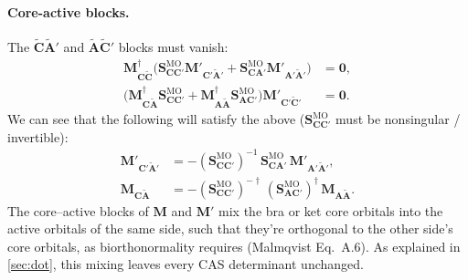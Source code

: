 \documentclass[aip,jcp,preprint]{revtex4-1}
\newcommand{\bvec}[1]{\mathbf{#1}}
\newcommand{\SMO}{\bvec{S}^{\mathrm{MO}}}
\begin{document}
\paragraph{Core-active blocks.}
The $\tilde{\bvec{C}}\tilde{\bvec{A}}'$ and $\tilde{\bvec{A}}\tilde{\bvec{C}}'$ blocks must vanish:
\begin{align}
 \bvec{M}_{\bvec{C}\tilde{\bvec{C}}}^\dagger
 \big(\SMO_{\bvec{C}\bvec{C}'}\bvec{M}'_{\bvec{C}'\tilde{\bvec{A}}'}
 + \SMO_{\bvec{C}\bvec{A}'}\bvec{M}'_{\bvec{A}'\tilde{\bvec{A}}'}\big)
 &= \bvec{0},\\
 \big(\bvec{M}_{\bvec{C}\tilde{\bvec{A}}}^\dagger\SMO_{\bvec{C}\bvec{C}'}
 + \bvec{M}_{\bvec{A}\tilde{\bvec{A}}}^\dagger\SMO_{\bvec{A}\bvec{C}'}\big)
 \bvec{M}'_{\bvec{C}'\tilde{\bvec{C}}'} &= \bvec{0}.
\end{align}
We can see that the following will satisfy the above ($\SMO_{\bvec{C}\bvec{C}'}$ must be nonsingular / invertible):
\begin{align}
 \bvec{M}'_{\bvec{C}'\tilde{\bvec{A}}'} &= -(\SMO_{\bvec{C}\bvec{C}'})^{-1}\,
 \SMO_{\bvec{C}\bvec{A}'}\, \bvec{M}'_{\bvec{A}'\tilde{\bvec{A}}'},
 \label{eq:ket-core-active}\\
 \bvec{M}_{\bvec{C}\tilde{\bvec{A}}} &= -(\SMO_{\bvec{C}\bvec{C}'})^{-\dagger}\,
 (\SMO_{\bvec{A}\bvec{C}'})^{\dagger}\, \bvec{M}_{\bvec{A}\tilde{\bvec{A}}}.
 \label{eq:bra-core-active}
\end{align}
The core--active blocks of $\bvec{M}$ and $\bvec{M}'$ mix the bra or ket core orbitals into the active orbitals of the same side, such that they're orthogonal to the other side's core orbitals, as biorthonormality requires (Malmqvist Eq.~A.6).
As explained in \cref{sec:dot}, this mixing leaves every CAS determinant unchanged.
\end{document}
